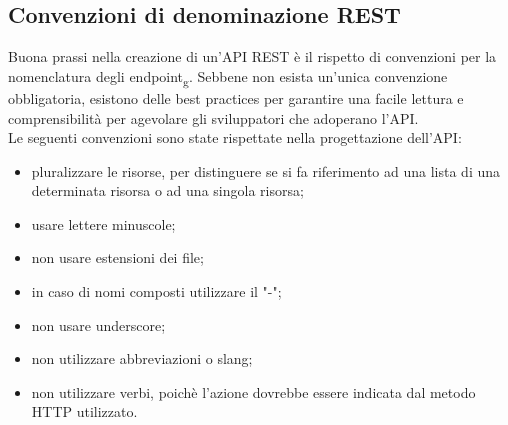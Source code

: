 \subsection{Convenzioni di denominazione REST}
Buona prassi nella creazione di un'API REST è il rispetto di convenzioni per la nomenclatura degli endpoint\textsubscript{g}. Sebbene non esista un'unica convenzione obbligatoria, esistono delle best practices per garantire una facile lettura e comprensibilità per agevolare gli sviluppatori che adoperano l'API.\\
Le seguenti convenzioni sono state rispettate nella progettazione dell'API:
\begin{itemize}
\item  pluralizzare le risorse, per distinguere se si fa riferimento ad una lista di una determinata risorsa o ad una singola risorsa;
\item usare lettere minuscole;
\item non usare estensioni dei file;
\item in caso di nomi composti utilizzare il "-";
\item non usare underscore;
\item non utilizzare abbreviazioni o slang;
\item non utilizzare verbi, poichè l'azione dovrebbe essere indicata dal metodo HTTP utilizzato.
\end{itemize}